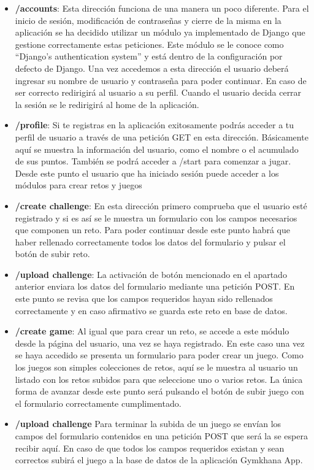 \documentclass[a4paper, 12pt]{book}
\begin{document}
\begin{itemize}
	\item \textbf {/accounts}: Esta dirección funciona de una manera un poco diferente. Para el inicio de sesión, modificación de contraseñas y cierre de la misma en la aplicación se ha decidido utilizar un módulo ya implementado de Django que gestione correctamente estas peticiones. Este módulo se le conoce como ``Django’s authentication system'' y está dentro de la configuración por defecto de Django. Una vez accedemos a esta dirección el usuario deberá ingresar su nombre de usuario y contraseña para poder continuar. En caso de ser correcto redirigirá al usuario a su perfil. Cuando el usuario decida cerrar la sesión se le redirigirá al home de la aplicación. 
	\item \textbf {/profile}: Si te registras en la aplicación exitosamente podrás acceder a tu perfil de usuario a través de una petición GET en esta dirección. Básicamente aquí se muestra la información del usuario, como el nombre o el acumulado de sus puntos. También se podrá acceder a /start para comenzar a jugar. Desde este punto el usuario que ha iniciado sesión puede acceder a los módulos para crear retos y juegos 
	\item \textbf {/create challenge}: En esta dirección primero comprueba que el usuario esté registrado y si es así se le muestra un formulario con los campos necesarios que componen un reto. Para poder continuar desde este punto habrá que haber rellenado correctamente todos los datos del formulario y pulsar el botón de subir reto. 
	\item \textbf {/upload challenge}: La activación de botón mencionado en el apartado anterior enviara los datos del formulario mediante una petición POST. En este punto se revisa que los campos requeridos hayan sido rellenados correctamente y en caso afirmativo se guarda este reto en base de datos.  
	\item \textbf {/create game}: Al igual que para crear un reto, se accede a este módulo desde la página del usuario, una vez se haya registrado. En este caso una vez se haya accedido se presenta un formulario para poder crear un juego. Como los juegos son simples colecciones de retos, aquí se le muestra al usuario un listado con los retos subidos para que seleccione uno o varios retos. La única forma de avanzar desde este punto será pulsando el botón de subir juego con el formulario correctamente cumplimentado. 
	\item \textbf {/upload challenge} Para terminar la subida de un juego se envían los campos del formulario contenidos en una petición POST que será la se espera recibir aquí. En caso de que todos los campos requeridos existan y sean correctos subirá el juego a la base de datos de la aplicación Gymkhana App.
	
\end{itemize}
\end{document}
